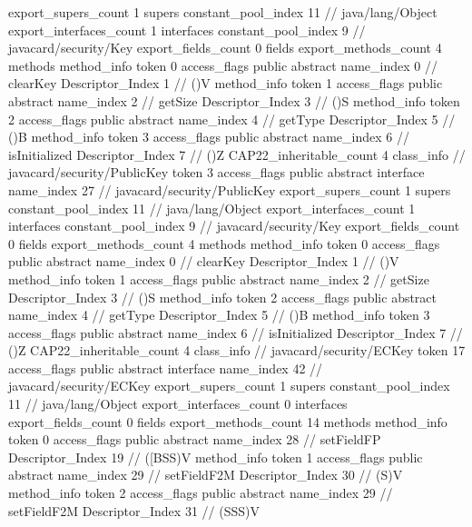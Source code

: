 {{{			export_supers_count	1
			supers {
				constant_pool_index	11		// java/lang/Object
			}
			export_interfaces_count	1
			interfaces {
				constant_pool_index	9		// javacard/security/Key
			}
			export_fields_count	0
			fields {
			}
			export_methods_count	4
			methods {
				method_info {
					token	0
					access_flags	public abstract
					name_index	0		// clearKey
					Descriptor_Index	1		// ()V
				}
				method_info {
					token	1
					access_flags	public abstract
					name_index	2		// getSize
					Descriptor_Index	3		// ()S
				}
				method_info {
					token	2
					access_flags	public abstract
					name_index	4		// getType
					Descriptor_Index	5		// ()B
				}
				method_info {
					token	3
					access_flags	public abstract
					name_index	6		// isInitialized
					Descriptor_Index	7		// ()Z
				}
			}
			CAP22_inheritable_count	4
		}
		class_info {		// javacard/security/PublicKey
			token	3
			access_flags	public abstract interface
			name_index	27		// javacard/security/PublicKey
			export_supers_count	1
			supers {
				constant_pool_index	11		// java/lang/Object
			}
			export_interfaces_count	1
			interfaces {
				constant_pool_index	9		// javacard/security/Key
			}
			export_fields_count	0
			fields {
			}
			export_methods_count	4
			methods {
				method_info {
					token	0
					access_flags	public abstract
					name_index	0		// clearKey
					Descriptor_Index	1		// ()V
				}
				method_info {
					token	1
					access_flags	public abstract
					name_index	2		// getSize
					Descriptor_Index	3		// ()S
				}
				method_info {
					token	2
					access_flags	public abstract
					name_index	4		// getType
					Descriptor_Index	5		// ()B
				}
				method_info {
					token	3
					access_flags	public abstract
					name_index	6		// isInitialized
					Descriptor_Index	7		// ()Z
				}
			}
			CAP22_inheritable_count	4
		}
		class_info {		// javacard/security/ECKey
			token	17
			access_flags	public abstract interface
			name_index	42		// javacard/security/ECKey
			export_supers_count	1
			supers {
				constant_pool_index	11		// java/lang/Object
			}
			export_interfaces_count	0
			interfaces {
			}
			export_fields_count	0
			fields {
			}
			export_methods_count	14
			methods {
				method_info {
					token	0
					access_flags	public abstract
					name_index	28		// setFieldFP
					Descriptor_Index	19		// ([BSS)V
				}
				method_info {
					token	1
					access_flags	public abstract
					name_index	29		// setFieldF2M
					Descriptor_Index	30		// (S)V
				}
				method_info {
					token	2
					access_flags	public abstract
					name_index	29		// setFieldF2M
					Descriptor_Index	31		// (SSS)V
}}}}}
